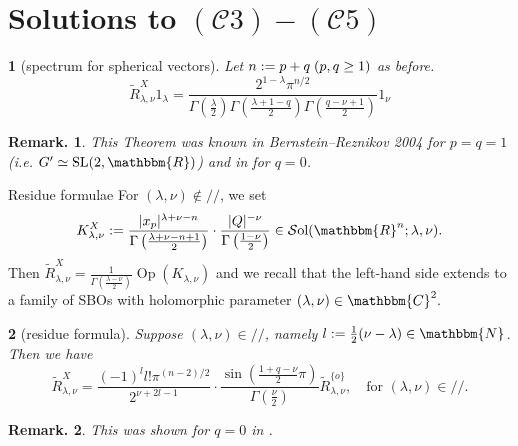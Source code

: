 \documentclass[notes,notheorems]{beamer}
\newcommand{\nin}{\not\in}
\newcommand{\tmop}[1]{\ensuremath{\operatorname{#1}}}
\newcommand{\assign}{:=}
\newtheorem{theorem}{\translate{Theorem}}[section]
\newtheorem{theorem}{\translate{Theorem}}
\theoremstyle{definition}
\theoremstyle{example}
\theoremstyle{plain}
\theoremstyle{mystyle}
\newtheorem*{remark}{Remark.}
\begin{document}
\section{Solutions to $(\mathcal{C}3) - (\mathcal{C}5)$}
\begin{frame}
	\begin{theorem}[spectrum for spherical vectors]
	Let $n
	\assign p + q \hspace{0.27em} (p, q \ge 1)$ as before.
	\begin{equation*}
		\tilde{R}_{\lambda, \nu}^X 1_{\lambda} =
\frac{2^{1 - \lambda} \pi^{n / 2}}{\Gamma \left( \frac{\lambda}{2} \right)
\Gamma \left( \frac{\lambda + 1 - q}{2} \right) \Gamma \left( \frac{q - \nu +
1}{2} \right)} 1_{\nu}
	\end{equation*}
	\end{theorem}
	\begin{remark}
This Theorem was known in
Bernstein--Reznikov 2004 for $p = q = 1$ (i.e. $G' \simeq \tmop{SL} (2,
\mathbbm{R})$) and in \cite{kobayashi2015symmetry} for $q = 0$.
	\end{remark}
\end{frame}
\begin{frame}{Residue formulae}
For $(\lambda,\nu)\nin //$, we set
\begin{equation*}
K_{\lambda, \nu}^X \assign \frac{| x_p |^{\lambda +
\nu - n}}{\Gamma \left( \frac{\lambda + \nu - n + 1}{2} \right)} \cdot \frac{|
Q |^{- \nu}}{\Gamma \left( \frac{1 - \nu}{2} \right)} \in \mathcal{S}
\mbox{ol} (\mathbbm{R}^n ; \lambda, \nu).
\end{equation*}
Then $\tilde{R}_{\lambda, \nu}^X = \frac{1}{\Gamma \left( \frac{\lambda -
\nu}{2} \right)} \tmop{Op} (K_{\lambda, \nu})$ and we recall that the
left-hand side extends to a family of SBOs with holomorphic parameter
$(\lambda, \nu) \in \mathbbm{C}^2.$
\begin{theorem}[residue formula]
Suppose $(\lambda,\nu)\in //$, namely $l \assign \frac{1}{2}  (\nu - \lambda) \in
\mathbbm{N}$. Then we have
\begin{equation*}
	\tilde{R}_{\lambda, \nu}^X = \frac{(- 1)^l l!
\pi^{(n - 2) / 2}}{2^{\nu + 2 l - 1}} \cdot \frac{\sin \left( \frac{1 + q -
\nu}{2} \pi \right)}{\Gamma \left( \frac{\nu}{2} \right)} \tilde{R}_{\lambda,
\nu}^{\{ o \}}, \quad \mbox{for }(\lambda, \nu) \in //.
\end{equation*}
\end{theorem}
\begin{remark}
	This was shown for $q = 0$ in
\cite{kobayashi2015symmetry}.
\end{remark}
\end{frame}
\end{document}
